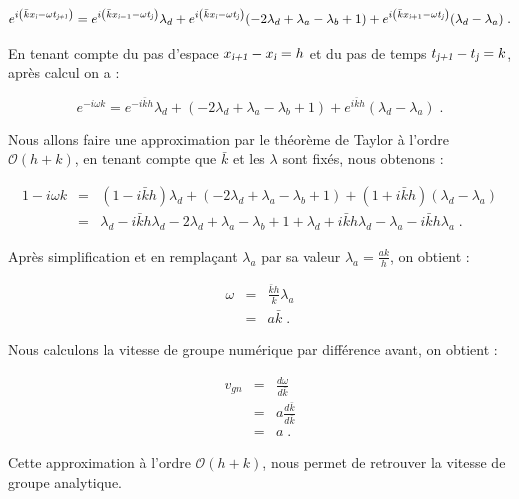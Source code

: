 \documentclass[a4paper, 12pt]{report}
\begin{document}
\begin{equation}
  e^{i\left(\bar{k}x_{\textsl{i}}-\omega t_{\textsl{j+1}}\right)} = e^{i\left(\bar{k}x_{\textsl{i}-1}-\omega t_{\textsl{j}}\right)} \lambda_d + e^{i\left(\bar{k}x_{\textsl{i}}-\omega t_{\textsl{j}}\right)} (-2 \lambda_d + \lambda_a - \lambda_b +1) + e^{i\left(\bar{k}x_{\textsl{i}+1}-\omega t_{\textsl{j}}\right)} (\lambda_d - \lambda_a)\;.
\end{equation}

En tenant compte du pas d'espace $x_{\textsl{i+1}}- x_{\textsl{i}}= h$ et du pas de temps $t_{\textsl{j+1}}- t_{\textsl{j}}= k$, après calcul on a :

\begin{equation}
  e^{-i\omega k} = e^{-i\bar{k}h} \lambda_d + (-2 \lambda_d + \lambda_a - \lambda_b +1) + e^{i\bar{k}h} (\lambda_d - \lambda_a) \;.
  \end{equation}

 Nous allons faire une approximation par le théorème de Taylor à l'ordre $\mathcal{O}(h+k)$, en tenant compte que $\bar{k}$ et les $\lambda$ sont fixés, nous obtenons :

 \begin{eqnarray*}
  1-i\omega k &=& (1-i\bar{k}h) \lambda_d + (-2 \lambda_d + \lambda_a - \lambda_b +1) + (1+i\bar{k}h) (\lambda_d - \lambda_a)\\
  &=& \lambda_d -i\bar{k}h \lambda_d - 2 \lambda_d + \lambda_a - \lambda_b + 1 + \lambda_d + i\bar{k}h \lambda_d - \lambda_a - i\bar{k}h \lambda_a \;.
  \end{eqnarray*}

  Après simplification et en remplaçant $\lambda_a$ par sa valeur $\lambda_a = \frac{ak}{h}$, on obtient :

  \begin{eqnarray}
  \omega  &=& \frac{\bar{k}h}{k}\lambda_a\\
	&=& a\bar{k}\;.
  \end{eqnarray}

   Nous calculons la vitesse de groupe numérique par différence avant, on obtient :

  \begin{eqnarray}
     v_{gn} &=& \frac{d\omega}{d\bar{k}}\\
     &=& a \frac{d\bar{k}}{d\bar{k}}\\
     &=& a \;.
  \end{eqnarray}

  Cette approximation à l'ordre $\mathcal{O}(h+k)$, nous permet de retrouver la vitesse de groupe analytique.
\end{document}

